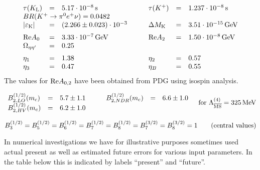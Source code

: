 \smallskip

\begin{displaymath}
\begin{array}{lclclcl}
\tau(K_{\rm L}) &=& 5.17  \cdot 10^{-8}\,{\rm s} &\quad&
\tau(K^+)       &=& 1.237 \cdot 10^{-8}\,{\rm s} \\
\multicolumn{7}{l}{ BR(\Kpienu) = 0.0482 } \\
|\eps_{\rm K}| &=& (2.266 \pm 0.023) \cdot 10^{-3} &\quad&
\Delta M_{\rm K} &=& 3.51 \cdot 10^{-15}\gev \\
\svs
\RE A_0 &=& 3.33 \cdot 10^{-7}\gev &\quad&
\RE A_2 &=& 1.50 \cdot 10^{-8}\gev \\
\Omega_{\eta\eta'} &=& 
\multicolumn{5}{l}{0.25} \\
\svs
\eta_1 &=& 1.38 &\quad& \eta_2 &=& 0.57 \\
\eta_3 &=& 0.47 &\quad& \eta_B &=& 0.55 \\
\end{array}
\end{displaymath}
The values for ${\rm Re} A_{0,2}$ have been obtained from PDG using isospin
analysis.

\smallskip

\begin{displaymath}
\begin{array}{lclclcl}
B_{2,LO}^{(1/2)}(m_{\rm c})  &=& 5.7 \pm 1.1 & \quad &
B_{2,NDR}^{(1/2)}(m_{\rm c}) &=& 6.6 \pm 1.0 \\
B_{2,HV}^{(1/2)}(m_{\rm c})  &=& 6.2 \pm 1.0 & \quad & & & \\
\end{array}
\mbox{\quad for\ } \Lambda_{\overline{\rm MS}}^{(4)} = 325\, {\rm MeV}
\end{displaymath}

\begin{displaymath}
B_3^{(1/2)} = B_5^{(1/2)} = B_6^{(1/2)} = B_7^{(1/2)} = B_8^{(1/2)} = 
B_7^{(3/2)} = B_8^{(3/2)} = 1
\qquad
\hbox{\rm (central values)}
\end{displaymath}

\goodbreak

In numerical investigations we have for illustrative purposes sometimes
used actual present as well as estimated future errors for various
input parameters. In the table below this is indicated by labels
``present'' and ``future''.

